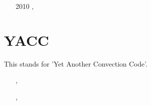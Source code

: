 \begin{small}
\begin{itemize}
\item[2010] \textcite{bepo10}, \textcite{beps10}
\end{itemize}
\end{small}





\section{YACC} 
This stands for 'Yet Another Convection Code'.

\begin{small}
\begin{itemize}
\item[\twothousandten]       \textcite{toyc10}, \textcite{kilv10}
\item[\twothousandeleven]    \textcite{yutc11}
\item[\twothousandtwelve]    \textcite{sato12}
\item[\twothousandthirteen]  \textcite{toyd13}, \textcite{pltb13}
\item[\twothousandfifteen]   \textcite{tosn15}
\item[\twothousandsixteen]   \textcite{tomy16}
\end{itemize}
\end{small}


